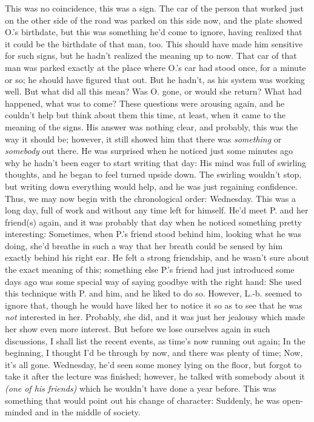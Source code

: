 This was no coincidence, this was a sign. 
The car of the person that worked just on the other side of the road was parked on this side now, and the plate showed O.'s birthdate, but this was something he'd come to ignore, having realized that it could be the birthdate of that man, too. 
This should have made him sensitive for such signs, but he hadn't realized the meaning up to now. That car of that man was parked exactly at the place where O.'s car had stood once, for a minute or so; he should have figured that out. 
But he hadn't, as his system was working well. 
But what did all this mean? Was O. gone, or would she return? What had happened, what was to come?
These questions were arousing again, and he couldn't help but think about them this time, at least, when it came to the meaning of the signs. His answer was nothing clear, and probably, this was the way it should be; however, it still showed him that there was \emph{something} or \emph{somebody} out there. 
He was surprised when he noticed just some minutes ago why he hadn't been eager to start writing that day: His mind was full of swirling thoughts, and he began to feel turned upside down. The swirling wouldn't stop, but writing down everything would help, and he was just regaining confidence. 
Thus, we may now begin with the chronological order: Wednesday. This was a long day, full of work and without any time left for himself. He'd meet P. and her friend(s) again, and it was probably that day when he noticed something pretty interesting: Sometimes, when P.'s friend stood behind him, looking what he was doing, she'd breathe in such a way that her breath could be sensed by him exactly behind his right ear. He felt a strong friendship, and he wasn't sure about the exact meaning of this; something else P.'s friend had just introduced some days ago was some special way of saying goodbye with the right hand: She used this technique with P. and him, and he liked to do so. However, L.-b. seemed to ignore that, though he would have liked her to notice it so as to see that he was \emph{not} interested in her. Probably, she did, and it was just her jealousy which made her show even more interest. 
But before we lose ourselves again in such discussions, I shall list the recent events, as time's now running out again; In the beginning, I thought I'd be through by now, and there was plenty of time; Now, it's all gone. 
Wednesday, he'd seen some money lying on the floor, but forgot to take it after the lecture was finished; however, he talked with somebody about it \emph{(one of his friends)} which he wouldn't have done a year before. This was something that would point out his change of character: Suddenly, he was open-minded and in the middle of society. 

